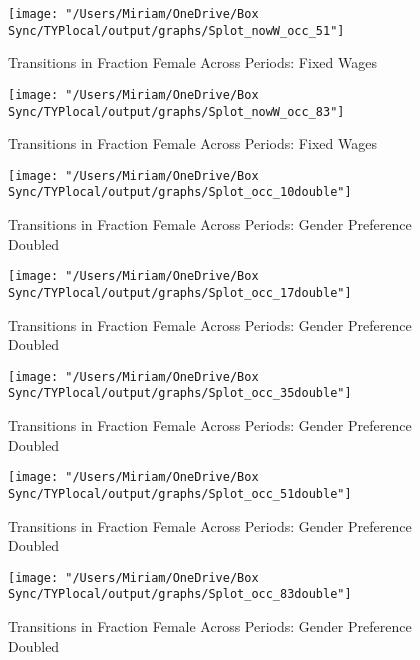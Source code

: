 \documentclass[11pt]{article}
\begin{document}
\begin{figure}[H]
\centering
\caption{Transitions in Fraction Female Across Periods: Fixed Wages}
\label{ftransitions51}
\texttt{[image: "/Users/Miriam/OneDrive/Box Sync/TYPlocal/output/graphs/Splot\_nowW\_occ\_51"]}
\end{figure}

\begin{figure}[H]
\centering
\caption{Transitions in Fraction Female Across Periods: Fixed Wages}
\label{ftransitions83}
\texttt{[image: "/Users/Miriam/OneDrive/Box Sync/TYPlocal/output/graphs/Splot\_nowW\_occ\_83"]}
\end{figure}


\begin{figure}[H]
\centering
\caption{Transitions in Fraction Female Across Periods: Gender Preference Doubled}
\label{ftransitions10}
\texttt{[image: "/Users/Miriam/OneDrive/Box Sync/TYPlocal/output/graphs/Splot\_occ\_10double"]}
\end{figure}

\begin{figure}[H]
\centering
\caption{Transitions in Fraction Female Across Periods: Gender Preference Doubled}
\label{ftransitions17}
\texttt{[image: "/Users/Miriam/OneDrive/Box Sync/TYPlocal/output/graphs/Splot\_occ\_17double"]}
\end{figure}

\begin{figure}[H]
\centering
\caption{Transitions in Fraction Female Across Periods: Gender Preference Doubled}
\label{ftransitions35}
\texttt{[image: "/Users/Miriam/OneDrive/Box Sync/TYPlocal/output/graphs/Splot\_occ\_35double"]}
\end{figure}

\begin{figure}[H]
\centering
\caption{Transitions in Fraction Female Across Periods: Gender Preference Doubled}
\label{ftransitions51}
\texttt{[image: "/Users/Miriam/OneDrive/Box Sync/TYPlocal/output/graphs/Splot\_occ\_51double"]}
\end{figure}

\begin{figure}[H]
\centering
\caption{Transitions in Fraction Female Across Periods: Gender Preference Doubled}
\label{ftransitions83}
\texttt{[image: "/Users/Miriam/OneDrive/Box Sync/TYPlocal/output/graphs/Splot\_occ\_83double"]}
\end{figure}
\end{document}
